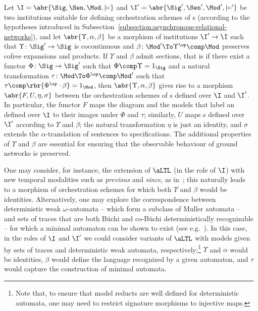 \documentclass{LMCS}
\begin{document}
  \begin{exa}
    \label{example:morphisms-of-orchestration-schemes-of-ARNs}
    Let \(\I = \abr{\Sig, \Sen, \Mod, \models}\) and \(\I' = \abr{\Sig', \Sen', \Mod', \models'}\) be two institutions suitable for defining orchestration schemes of s (according to the hypotheses introduced in Subsection~\ref{subsection:asynchronous-relational-networks}), and let \(\abr{\Upsilon, \alpha, \beta}\) be a morphism of institutions \(\I' \to \I\) such that \(\Upsilon \colon \Sig' \to \Sig\) is cocontinuous and \(\beta \colon \Mod' \To \Upsilon^{\op} \comp \Mod\) preserves cofree expansions and products.
    If \(\Upsilon\) and \(\beta\) admit sections, that is if there exist a functor \(\Phi \colon \Sig \to \Sig'\) such that \(\Phi \comp \Upsilon = 1_{\Sig}\) and a natural transformation \(\tau \colon \Mod \To \Phi^{\op} \comp \Mod'\) such that \(\tau \comp \rbr{\Phi^{\op} \cdot \beta} = 1_{\Mod}\), then \(\abr{\Upsilon, \alpha, \beta}\) gives rise to a morphism \(\abr{F, U, \eta, \sigma}\) between the orchestration schemes of s defined over \(\I\) and \(\I'\).
    In particular, the functor \(F\) maps the diagram and the models that label an  defined over \(\I\) to their images under \(\Phi\) and \(\tau\); similarly, \(U\) maps s defined over \(\I'\) according to \(\Upsilon\) and \(\beta\); the natural transformation \(\eta\) is just an identity, and \(\sigma\) extends the \(\alpha\)\nb-translation of sentences to specifications. The additional properties of \(\Upsilon\) and \(\beta\) are essential for ensuring that the observable behaviour of ground networks is preserved.

    One may consider, for instance, the extension of \(\aLTL\) (in the role of \(\I\)) with new temporal modalities such as \emph{previous} and \emph{since}, as in~\cite{Knapp-Marczynski-Wirsing-Zawlocki:A-heterogeneous-approach-to-service-oriented-systems-specification-2010}; this naturally leads to a morphism of orchestration schemes for which both \(\Upsilon\) and \(\beta\) would be identities.
    Alternatively, one may explore the correspondence between deterministic weak \(\omega\)\nb-automata -- which form a subclass of Muller automata -- and sets of traces that are both B\"{u}chi and co\nb-B\"{u}chi deterministically recognizable -- for which a minimal automaton can be shown to exist (see e.g.~\cite{Maler-Staiger:Syntactic-congruences-for-omega-languages-1997,Loding:Efficient-minimization-of-deterministic-weak-omega-automata-2001}). In this case, in the roles of \(\I\) and \(\I'\) we could consider variants of \(\aLTL\) with models given by sets of traces and deterministic weak automata, respectively;\footnote{Note that, to ensure that model reducts are well defined for deterministic automata, one may need to restrict signature morphisms to injective maps.} \(\Upsilon\) and \(\alpha\) would be identities, \(\beta\) would define the language recognized by a given automaton, and \(\tau\) would capture the construction of minimal automata.
  \end{exa}
\end{document}
